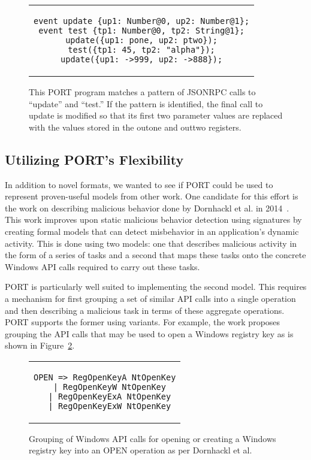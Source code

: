 \begin{figure}[H]
\centering
\begin{tabular}{c}
\begin{lstlisting}
event update {up1: Number@0, up2: Number@1};
event test {tp1: Number@0, tp2: String@1};
update({up1: pone, up2: ptwo});
test({tp1: 45, tp2: "alpha"});
update({up1: ->999, up2: ->888});
\end{lstlisting}
\end{tabular}
\caption{This PORT program matches a pattern of JSONRPC calls to
  ``update'' and ``test.''  If the pattern is identified, the final call to
  update is modified so that its first two parameter values are replaced
  with the values stored in the outone and outtwo registers.}
\label{lst:JSONProgram}
\end{figure}


\subsection{Utilizing PORT's Flexibility}
In addition to novel formats, we wanted to see if PORT could be used to
represent proven-useful models from other work.  One candidate for this
effort is the work on describing malicious behavior done by Dornhackl et
al. in 2014~\cite{Dornhackl2014}.  This work improves upon static malicious
behavior detection using signatures by creating formal models that can
detect misbehavior in an application's dynamic activity.  This is done
using two models: one that describes malicious activity in the form of a
series of tasks and a second that maps these tasks onto the concrete
Windows API calls required to carry out these tasks.

PORT is particularly well suited to implementing the second model.  This
requires a mechanism for first grouping a set of similar API calls
into a single operation and then describing a malicious task in terms of
these aggregate operations.  PORT supports the former using variants.
For example, the work proposes grouping the API calls that may be used to
open a Windows registry key as is shown in Figure~\ref{lst:DornhacklOpen}.

\begin{figure}[H]
\centering
\begin{tabular}{c}
\begin{lstlisting}
OPEN => RegOpenKeyA NtOpenKey
  | RegOpenKeyW NtOpenKey
  | RegOpenKeyExA NtOpenKey
  | RegOpenKeyExW NtOpenKey
\end{lstlisting}
\end{tabular}
\caption{Grouping of Windows API calls for opening or creating a Windows
  registry key into an OPEN operation as per Dornhackl et al.}
\label{lst:DornhacklOpen}
\end{figure}


